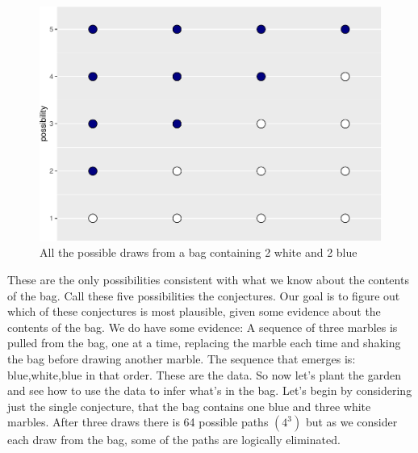 \documentclass{article}
\begin{document}
\begin{figure}

{\centering \includegraphics{qrap_paper_files/figure-latex/possibilities-1} 

}

\caption{All the possible draws from a bag containing 2 white and 2 blue}\label{fig:possibilities}
\end{figure}

These are the only possibilities consistent with what we know about the
contents of the bag. Call these five possibilities the conjectures. Our
goal is to figure out which of these conjectures is most plausible,
given some evidence about the contents of the bag. We do have some
evidence: A sequence of three marbles is pulled from the bag, one at a
time, replacing the marble each time and shaking the bag before drawing
another marble. The sequence that emerges is: blue,white,blue in that
order. These are the data. So now let's plant the garden and see how to
use the data to infer what's in the bag. Let's begin by considering just
the single conjecture, that the bag contains one blue and three white
marbles. After three draws there is 64 possible paths \((4^3)\) but as
we consider each draw from the bag, some of the paths are logically
eliminated.
\end{document}

